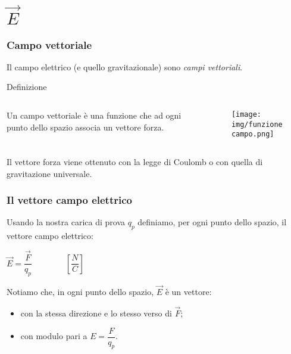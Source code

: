 \documentclass[]{beamer}
\theoremstyle{plain}
\begin{document}
\section{$ \vec{E} $}

\begin{frame}
\frametitle{Campo vettoriale}
Il campo elettrico (e quello gravitazionale) sono \emph{campi vettoriali}.

\begin{block}{Definizione}
\begin{columns}
\begin{column}{0.4\textwidth}
Un campo vettoriale è una funzione che ad ogni punto dello spazio associa un vettore forza.
\end{column}
\begin{column}{0.4\textwidth}
\begin{figure}
\texttt{[image: img/funzionecampo.png]}
\end{figure}
\end{column}
\end{columns}
\end{block}

Il vettore forza viene ottenuto con la legge di Coulomb o con quella di gravitazione universale.
\end{frame}


\begin{frame}
\frametitle{Il vettore campo elettrico}
\begin{figure}
\end{figure}
Usando la nostra carica di prova $ q_p $ definiamo, per ogni punto dello spazio, il \alert{vettore campo elettrico}:

\begin{center}
\colorbox{blue!30}{$ \vec{E} = \dfrac{\vec{F}}{q_p} $}~~~~~~~~$ \left[\dfrac{N}{C}\right] $
\end{center}\pause
Notiamo che, in ogni punto dello spazio, \alert{$ \vec{E} $ è un vettore}:
\begin{itemize}
  \item con la stessa direzione e lo stesso verso di $ \vec{F} $;\pause
  \item con modulo pari a $ E = \dfrac{F}{q_p} $.
\end{itemize}
\end{frame}
\end{document}
